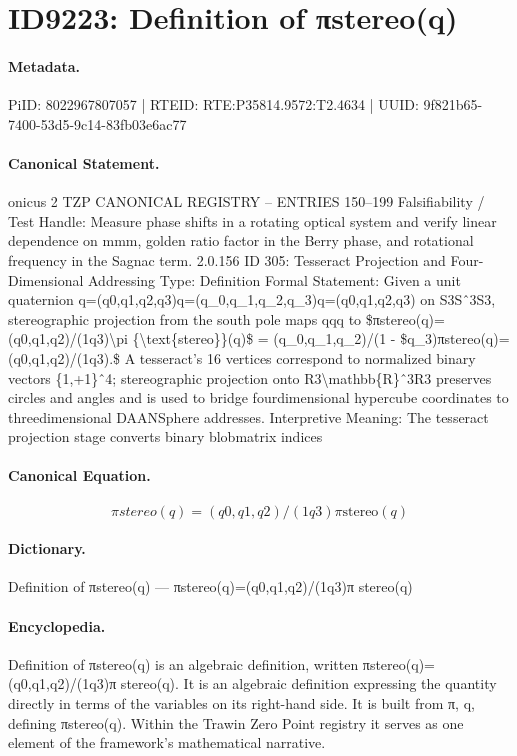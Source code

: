 \section*{ID9223: Definition of πstereo(q)}
\paragraph{Metadata.}
PiID: 8022967807057 | RTEID: RTE:P35814.9572:T2.4634 | UUID: 9f821b65-7400-53d5-9c14-83fb03e6ac77

\paragraph{Canonical Statement.}
onicus 2 TZP CANONICAL REGISTRY – ENTRIES 150–199 Falsifiability / Test Handle: Measure phase shifts in a rotating optical system and verify linear dependence on mmm, golden ratio factor in the Berry phase, and rotational frequency in the Sagnac term. 2.0.156 ID 305: Tesseract Projection and Four-Dimensional Addressing Type: Definition Formal Statement: Given a unit quaternion q=(q0,q1,q2,q3)q=(q\_0,q\_1,q\_2,q\_3)q=(q0,q1,q2,q3) on S3Sˆ3S3, stereographic projection from the south pole maps qqq to \$πstereo(q)=(q0,q1,q2)/(1q3)\textbackslash{}pi \{\textbackslash{}text\{stereo\}\}(q)\$ = (q\_0,q\_1,q\_2)/(1 - \$q\_3)πstereo(q)=(q0,q1,q2)/(1q3).\$ A tesseract’s 16 vertices correspond to normalized binary vectors \{1,+1\}ˆ4; stereographic projection onto R3\textbackslash{}mathbb\{R\}ˆ3R3 preserves circles and angles and is used to bridge fourdimensional hypercube coordinates to threedimensional DAANSphere addresses. Interpretive Meaning: The tesseract projection stage converts binary blobmatrix indices

\paragraph{Canonical Equation.}
\[
πstereo(q)=(q0,q1,q2)/(1q3)\pi {\text{stereo}}(q)
\]

\paragraph{Dictionary.}
Definition of πstereo(q) — πstereo(q)=(q0,q1,q2)/(1q3)π stereo(q)

\paragraph{Encyclopedia.}
Definition of πstereo(q) is an algebraic definition, written πstereo(q)=(q0,q1,q2)/(1q3)π stereo(q). It is an algebraic definition expressing the quantity directly in terms of the variables on its right-hand side. It is built from π, q, defining πstereo(q). Within the Trawin Zero Point registry it serves as one element of the framework's mathematical narrative.
